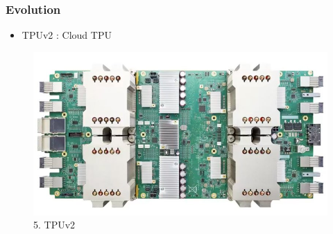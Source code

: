 \documentclass[c]{beamer}
\begin{document}
	\begin{frame} [c]
		\frametitle{Evolution}
        \begin{itemize}
        \justifying
              \item \large TPUv2 : Cloud TPU
           \end{itemize} 
           \begin{figure}
            \centering
            \includegraphics[scale=.4]{images/5cloudtpu.png}
            \caption{5. TPUv2}
            \label{fig:TPUv2}
           \end{figure}
	\end{frame}
	  
\end{document}
